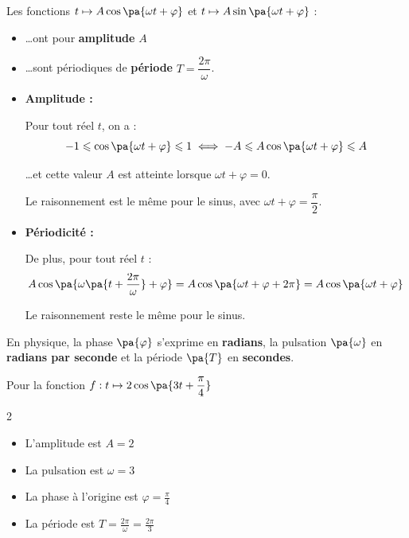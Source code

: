 \begin{prop}
	Les fonctions $t \mapsto A\cos\pa{\omega t + \varphi}$ et $t \mapsto A\sin\pa{\omega t + \varphi}$ :

	\begin{itemize}
		\item \ldots ont pour \textbf{amplitude} $A$
		\item \ldots sont périodiques de \textbf{période} $T = \dfrac{2\pi}{\omega}$.
	\end{itemize}
\end{prop}

\begin{demo}
	\nline
	\begin{itemize}
		\item \textbf{Amplitude :}

		      Pour tout réel $t$, on a :
		      \[
			      -1 \leq \cos\pa{\omega t + \varphi} \leq 1\iff -A \leq A\cos\pa{\omega t + \varphi} \leq A
		      \]

		      \ldots et cette valeur $A$ est atteinte lorsque $\omega t + \varphi = 0$.

		      Le raisonnement est le même pour le sinus, avec $\omega t + \varphi = \dfrac{\pi}{2}$.

		\item \textbf{Périodicité :}

		      De plus, pour tout réel $t$ :
		      \[
			      A\cos\pa{\omega\pa{t + \dfrac{2\pi}{\omega}} + \varphi} = A\cos\pa{\omega t + \varphi + 2\pi} = A\cos\pa{\omega t + \varphi}
		      \]

		      Le raisonnement reste le même pour le sinus.
	\end{itemize}
\end{demo}

\begin{rem}
	En physique, la phase $\pa{\varphi}$ s'exprime en \textbf{radians}, la pulsation $\pa{\omega}$ en \textbf{radians par seconde} et la période $\pa{T}$ en \textbf{secondes}.
\end{rem}

\begin{ex}
	Pour la fonction $f : t \mapsto 2\cos\pa{3t + \dfrac{\pi}{4}}$

	\begin{multicols}{2}
		\begin{itemize}
			\item L'amplitude est $A = 2$
			\item La pulsation est $\omega = 3$
			\item La phase à l'origine est $\varphi = \tfrac{\pi}{4}$
			\item La période est $T = \tfrac{2\pi}{\omega} = \tfrac{2\pi}{3}$
		\end{itemize}
	\end{multicols}
\end{ex}

